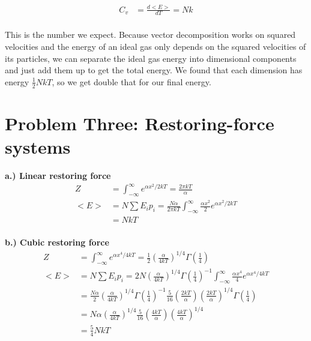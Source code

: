 \documentclass[10pt]{article} %
\begin{document}
\begin{align*}
  C_v &= \frac{d<E>}{dT} = Nk\\
\end{align*}

This is the number we expect. Because vector decomposition works on squared velocities and the
energy of an ideal gas only depends on the squared velocities of its particles, we can separate
the ideal gas energy into dimensional components and just add them up to get the total energy.
We found that each dimension has energy $\frac{1}{2}NkT$, so we get double that for our final
energy.\\

\section{Problem Three: Restoring-force systems}

\textbf{a.) Linear restoring force}
\begin{align*}
  Z &= \int_{-\infty}^{\infty}e^{\alpha x^2/2kT} = \frac{2\pi kT}{\alpha}\\
  <E> &= N\sum E_ip_i = \frac{N\alpha}{2\pi kT}
  \int_{-\infty}^{\infty}\frac{\alpha x^2}{2}e^{\alpha x^2/2kT}\\
  &= NkT\\
\end{align*}

\textbf{b.) Cubic restoring force}
\begin{align*}
  Z &= \int_{-\infty}^{\infty}e^{\alpha x^4/4kT}
  = \frac{1}{2}\left(\frac{\alpha}{4kT}\right)^{1/4}\Gamma\left(\frac{1}{4}\right)\\
  <E> &= N\sum E_ip_i =
  2N\left(\frac{\alpha}{4kT}\right)^{1/4}\Gamma\left(\frac{1}{4}\right)^{-1}
  \int_{-\infty}^{\infty}\frac{\alpha x^4}{4}e^{\alpha x^4/4kT}\\
  &= \frac{N\alpha}{2}\left(\frac{\alpha}{4kT}\right)^{1/4}\Gamma\left(\frac{1}{4}\right)^{-1}
  \frac{5}{16}\left(\frac{2kT}{\alpha}\right)\left(\frac{2kT}{\alpha}\right)^{1/4}
  \Gamma\left(\frac{1}{4}\right)\\
  &= N\alpha\left(\frac{\alpha}{4kT}\right)^{1/4}
  \frac{5}{16}\left(\frac{4kT}{\alpha}\right)\left(\frac{4kT}{\alpha}\right)^{1/4}\\
  &= \frac{5}{4}NkT\\
\end{align*}
\end{document}
